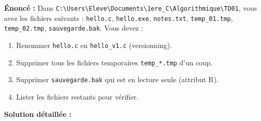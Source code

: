 \documentclass[11pt]{article}
\begin{document}
\begin{exoresolu}
\textbf{Énoncé :} Dans \texttt{C:\textbackslash Users\textbackslash Eleve\textbackslash Documents\textbackslash 1ere\_C\textbackslash Algorithmique\textbackslash TD01}, vous avez les fichiers suivants :
\texttt{hello.c}, \texttt{hello.exe}, \texttt{notes.txt}, \texttt{temp\_01.tmp}, \texttt{temp\_02.tmp}, \texttt{sauvegarde.bak}.
Vous devez :
\begin{enumerate}
    \item Renommer \texttt{hello.c} en \texttt{hello\_v1.c} (versionning).
    \item Supprimer tous les fichiers temporaires \texttt{temp\_*.tmp} d'un coup.
    \item Supprimer \texttt{sauvegarde.bak} qui est en lecture seule (attribut R).
    \item Lister les fichiers restants pour vérifier.
\end{enumerate}
\tcblower
\textbf{Solution détaillée :}


\end{exoresolu}
\end{document}

